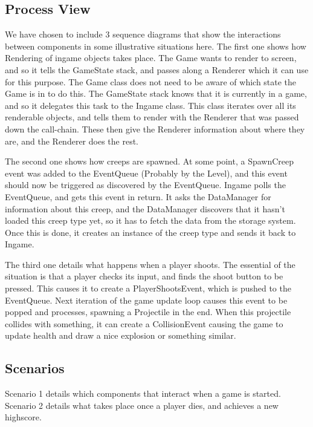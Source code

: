 \subsection{Process View}
We have chosen to include 3 sequence diagrams that show the interactions between
components in some illustrative situations here. The first one shows how Rendering
of ingame objects takes place. The Game wants to render to screen, and so it
tells the GameState stack, and passes along a Renderer which it can use for this
purpose. The Game class does not need to be aware of which state the Game is in
to do this. The GameState stack knows that it is currently in a game, and so
it delegates this task to the Ingame class. This class iterates over all its
renderable objects, and tells them to render with the Renderer that was passed
down the call-chain. These then give the Renderer information about where they
are, and the Renderer does the rest.

The second one shows how creeps are spawned. At some point, a SpawnCreep event
was added to the EventQueue (Probably by the Level), and this event should now
be triggered as discovered by the EventQueue. Ingame polls the EventQueue,
and gets this event in return. It asks the DataManager for information about this
creep, and the DataManager discovers that it hasn't loaded this creep type yet, so
it has to fetch the data from the storage system. Once this is done, it
creates an instance of the creep type and sends it back to Ingame.

The third one details what happens when a player shoots. The essential of the
situation is that a player checks its input, and finds the shoot button to be
pressed. This causes it to create a PlayerShootsEvent, which is pushed to the
EventQueue. Next iteration of the game update loop causes this event to be
popped and processes, spawning a Projectile in the end. When this projectile
collides with something, it can create a CollisionEvent causing the game
to update health and draw a nice explosion or something similar.

\subsection{Scenarios}

Scenario 1 details which components that interact when a game is started. Scenario
2 details what takes place once a player dies, and achieves a new highscore.
